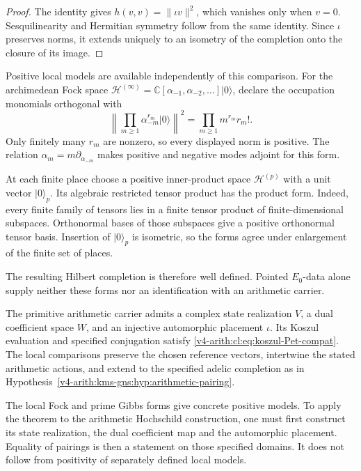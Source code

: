 \begin{proof}
The identity gives \(h(v,v)=\|\iota v\|^2\), which vanishes only
when \(v=0\). Sesquilinearity and Hermitian symmetry follow from
the same identity. Since \(\iota\) preserves norms, it extends
uniquely to an isometry of the completion onto the closure of its
image.
\end{proof}

Positive local models are available independently of this comparison.
For the archimedean Fock space
\(\mathcal H^{(\infty)}=\mathbb C[\alpha_{-1},\alpha_{-2},\ldots]|0\rangle\),
declare the occupation monomials orthogonal with
\[
\left\|\prod_{m\geq1}\alpha_{-m}^{r_m}|0\rangle\right\|^2
=\prod_{m\geq1}m^{r_m}r_m!.
\]
Only finitely many \(r_m\) are nonzero, so every displayed norm
is positive. The relation \(\alpha_m=m\partial_{\alpha_{-m}}\)
makes positive and negative modes adjoint for this form.

At each finite place choose a positive inner-product space
\(\mathcal H^{(p)}\) with a unit vector \(|0\rangle_p\).
Its algebraic restricted tensor product has the product form.
Indeed, every finite family of tensors lies in a finite tensor
product of finite-dimensional subspaces. Orthonormal bases of those
subspaces give a positive orthonormal tensor basis. Insertion of
\(|0\rangle_p\) is isometric, so the forms agree under enlargement
of the finite set of places.

The resulting Hilbert completion is
therefore well defined. Pointed \(E_0\)-data alone supply neither
these forms nor an identification with an arithmetic carrier.

\begin{conjecture}
\label{v4-arith:cl:cj:koszul-Petersson-compat}
The primitive arithmetic carrier admits a complex state realization
\(V\), a dual coefficient space \(W\), and an injective automorphic
placement \(\iota\). Its Koszul evaluation and specified conjugation
satisfy \eqref{v4-arith:cl:eq:koszul-Pet-compat}.
The local comparisons preserve the chosen reference vectors,
intertwine the stated arithmetic actions, and extend to the
specified adelic completion as in
Hypothesis~\ref{v4-arith:kms-gns:hyp:arithmetic-pairing}.
\end{conjecture}

\begin{remark}
\label{v4-arith:cl:rem:P3-residual}
The local Fock and prime Gibbs forms give concrete positive models.
To apply the theorem to the arithmetic Hochschild construction,
one must first construct its state realization, the dual coefficient
map and the automorphic placement. Equality of pairings is then a
statement on those specified domains. It does not follow from
positivity of separately defined local models.
\end{remark}

